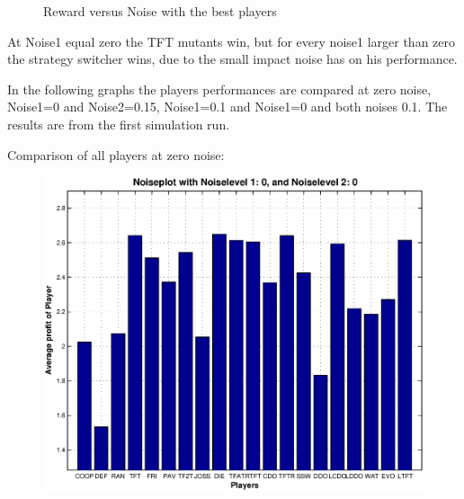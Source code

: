 \begin{figure}[h]
\begin{minipage}[hbt]{0.3\textwidth}
\end{minipage}	\caption{Reward versus Noise with the best players}
	\label{pic player best}
\end{figure}

At Noise1 equal zero the TFT mutants win, but for every noise1 larger than zero the strategy switcher wins, due to the small impact noise has on his performance.

In the following graphs the players performances are compared at zero noise, Noise1=0 and Noise2=0.15, Noise1=0.1 and Noise1=0 and both noises 0.1. The results are from the first simulation run.

Comparison of all players at zero noise:

\begin{figure}[h]

\begin{minipage}[hbt]{0.68\textwidth}
	\centering
	\includegraphics[width=\textwidth]{pics/simulation1/Reward_of__all_Players_at_given_Noiselevels_1}
\end{minipage}
\hfill
\begin{minipage}[hbt]{0.3\textwidth}
	\centering

\end{minipage}
\end{figure}
